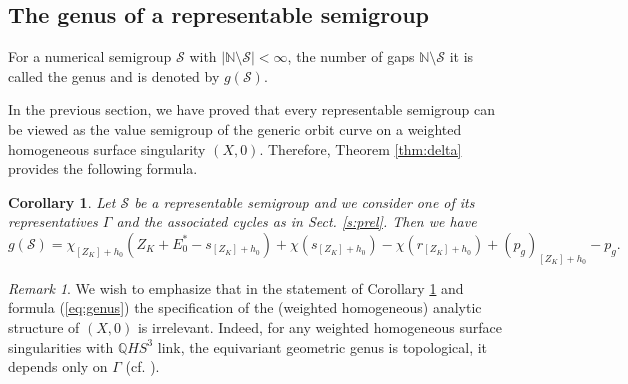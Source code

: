 \documentclass[12pt,a4paper]{amsart}
\def\cS{{\mathcal S}}
\newtheorem{cor}{Corollary}[section]
\theoremstyle{remark}
\newtheorem{rem}{Remark}[section]
\theoremstyle{definition}
\begin{document}
\subsection{The genus of a representable semigroup} For a numerical semigroup $\cS$ with 
$|\mathbb{N}\setminus \cS| <\infty$, the number of gaps $\mathbb{N}\setminus \cS$
it is called the genus and is denoted by $g(\cS)$. 

In the previous section, we have proved that every representable semigroup can be viewed as the value semigroup of the generic orbit curve on a weighted homogeneous surface singularity  $(X,0)$. Therefore, Theorem \ref{thm:delta}  provides the following formula.  
\begin{cor}\label{cor:4.3}
Let $\cS$ be a representable semigroup and we consider one of its representatives $\Gamma$ and the associated cycles as in Sect. \ref{s:prel}. Then we have 
\begin{equation}\label{eq:genus}
g(\cS)=\chi_{[Z_K]+h_0}(Z_K+E_0^*-s_{[Z_K]+h_0})+\chi(s_{[Z_K]+h_0})-\chi(r_{[Z_K]+h_0})+(p_g)_{[Z_K]+h_0}-p_g.
\end{equation}
\end{cor}

\begin{rem}
We wish to emphasize that in the statement of Corollary \ref{cor:4.3} and formula 
(\ref{eq:genus}) the specification of the (weighted homogeneous) 
analytic structure of $(X,0)$ is irrelevant. Indeed, 
for any weighted homogeneous surface singularities with $\mathbb{Q}HS^3$ link, the equivariant geometric genus is topological, it depends only on $\Gamma$ (cf. \cite{NNII, nbook}). 
\end{rem}

\end{document}
